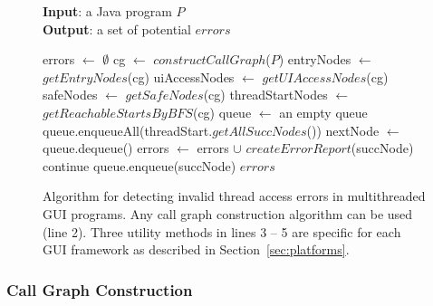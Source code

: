 \begin{figure}[t]
\textbf{Input}: a Java program $P$\\
\textbf{Output}: a set of potential $errors$\\
\vspace{-5mm}
\begin{algorithmic}[1]
\STATE errors $\leftarrow$ $\emptyset$
\STATE cg $\leftarrow$ $constructCallGraph$($P$)
\STATE entryNodes $\leftarrow$ $getEntryNodes$(cg)
\STATE uiAccessNodes $\leftarrow$ $getUIAccessNodes$(cg)
\STATE safeNodes $\leftarrow$ $getSafeNodes$(cg)
\STATE threadStartNodes $\leftarrow$ $getReachableStartsByBFS$(cg)
\STATE queue $\leftarrow$ an empty queue
\STATE queue.enqueueAll(threadStart.$getAllSuccNodes$())
\STATE nextNode $\leftarrow$ queue.dequeue()
\STATE errors $\leftarrow$ errors $\cup$ $createErrorReport$(succNode)
\STATE continue
\ELSE
\STATE queue.enqueue(succNode)
\ENDIF 
\ENDFOR
\ENDWHILE
\ENDFOR
\ENDFOR
\RETURN $errors$
\vspace{-2mm}
\end{algorithmic}
\caption{Algorithm for detecting invalid thread access errors in multithreaded GUI programs. 
Any call graph construction algorithm can be used (line 2).
Three utility methods in lines 3 -- 5 are specific for each GUI framework
 as described in Section~\ref{sec:platforms}.
} \label{fig:detectalgorithm}
\end{figure}


\subsubsection{Call Graph Construction}
\label{sec:cg}

% 

